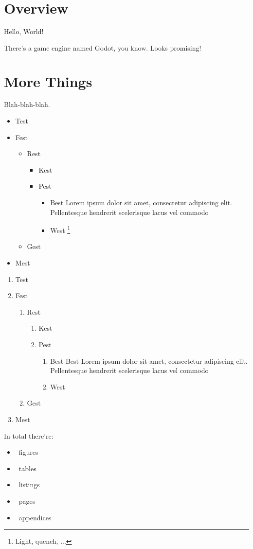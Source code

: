 \section{Overview}

Hello, World!

There's a game engine named Godot\cite{godot}, you know. Looks promising!

\section{More Things}

Blah-blah-blah.

\begin{itemize}
    \item Test
    \item Fest
    \begin{itemize}
        \item Rest
        \begin{itemize}
            \item Kest
            \item Pest
            \begin{itemize}
                \item Best Lorem ipsum dolor sit amet, consectetur adipiscing elit. Pellentesque hendrerit scelerisque lacus vel commodo
                \item West \footnote{Light, quench, ...}
            \end{itemize}
        \end{itemize}
        \item Gest
    \end{itemize}
    \item Mest
\end{itemize}

\begin{enumerate}
    \item Test
    \item Fest
    \begin{enumerate}
        \item Rest
        \begin{enumerate}
            \item Kest
            \item Pest
            \begin{enumerate}
                \item Best Best Lorem ipsum dolor sit amet, consectetur adipiscing elit. Pellentesque hendrerit scelerisque lacus vel commodo
                \item West
            \end{enumerate}
        \end{enumerate}
        \item Gest
    \end{enumerate}
    \item Mest
\end{enumerate}

In total there're:

\begin{itemize}
    \item \totalfigurescount\ figures
    \item \totaltablescount\ tables
    \item \totallistingscount\ listings
    \item \totalpagescount\ pages
    \item \totalappendicescount\ appendices
\end{itemize}
